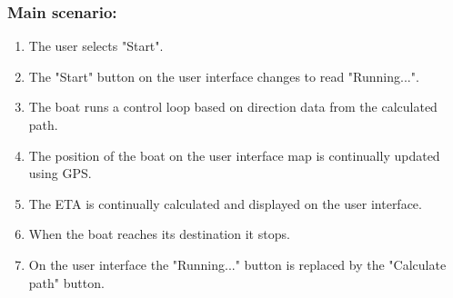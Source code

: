 \begin{framed}
	\subsubsection*{Main scenario:}
	\begin{enumerate}
		\item The user selects "Start".
		\item The "Start" button on the user interface changes to read "Running...".
		\item The boat runs a control loop based on direction data from the calculated path.
		\item The position of the boat on the user interface map is continually updated using GPS.
		\item The ETA is continually calculated and displayed on the user interface.
		\item When the boat reaches its destination it stops.
		\item On the user interface the "Running..." button is replaced by the "Calculate path" button.
	\end{enumerate}	
\end{framed}	

